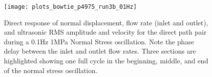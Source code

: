 %

\begin{figure}[h]
	\centering
	\texttt{[image: plots\_bowtie\_p4975\_run3b\_01Hz]}
	\caption[]{Direct response of normal displacement, flow rate (inlet and outlet), and ultrasonic RMS amplitude and velocity for the direct path pair during a 0.1Hz 1MPa Normal Stress oscillation. Note the phase delay between the inlet and outlet flow rates. Three sections are highlighted showing one full cycle in the beginning, middle, and end of the normal stress oscillation. }
	\label{fig:NS_p4975_run3b_01Hz}
\end{figure}

